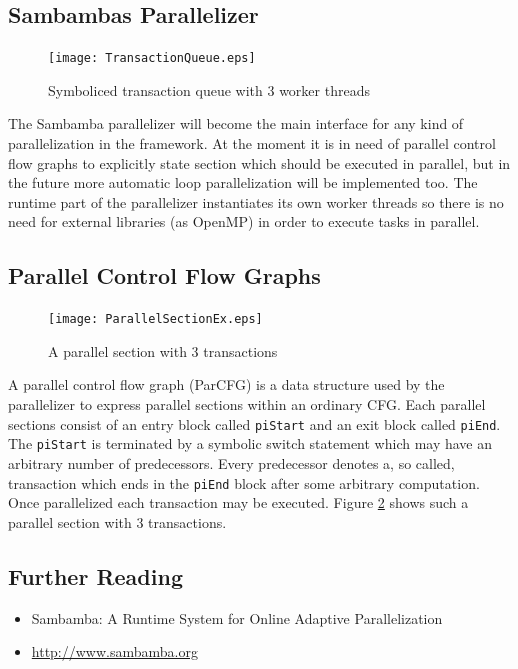 \subsection{Sambambas Parallelizer}
\begin{figure}
  \centering
  \texttt{[image: TransactionQueue.eps]}
  \caption{Symboliced transaction queue with 3 worker threads}
  \label{fig:TransactionQueue}  
\end{figure}
The Sambamba parallelizer will become the main interface for any kind of 
parallelization in the framework. At the moment it is in need of parallel control
flow graphs to explicitly state section which should be executed in parallel, but
in the future more automatic loop parallelization will be implemented too. 
The runtime part of the parallelizer instantiates its own worker threads so there
is no need for external libraries (as OpenMP) in order to execute tasks in parallel. \\


\subsection{Parallel Control Flow Graphs}
\begin{figure}
  \centering
  \vspace*{-5mm}
  \begin{minipage}[c][0.37\width]{\textwidth}
  \texttt{[image: ParallelSectionEx.eps]}
  \end{minipage}
  \caption{A parallel section with 3 transactions}
  \label{fig:ParallelSectionEx}  
\end{figure}
A parallel control flow graph (ParCFG) is a data structure used by the
parallelizer to express parallel sections within an ordinary CFG. 
Each parallel sections consist of an entry block called \texttt{piStart} and
an exit block called \texttt{piEnd}. The \texttt{piStart} is terminated by a 
symbolic switch statement which may have an arbitrary number of predecessors. 
Every predecessor denotes a, so called, transaction which ends in the 
\texttt{piEnd} block after some arbitrary computation. 
Once parallelized each transaction may be executed.
Figure \ref{fig:ParallelSectionEx} shows such a parallel section with 3 
transactions. 


\subsection*{Further Reading}
\begin{itemize}
  \item Sambamba: A Runtime System for Online Adaptive Parallelization \cite{DBLP:conf/cc/StreitHZH12}  
  \item \url{http://www.sambamba.org} \nocite{StreitHZH12:Online}
\end{itemize}



